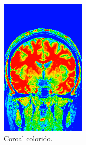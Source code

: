 \documentclass{article}
\begin{document}
\begin{figure}[H]
\begin{subfigure}[b]{0.3\textwidth}
        \includegraphics[width=\textwidth]{brain/radiologist-coronal.png}
        \caption{Coroal colorido.}
    \end{subfigure}
    ~
    \begin{subfigure}[b]{0.3\textwidth}

\end{subfigure}
\end{figure}
\end{document}

